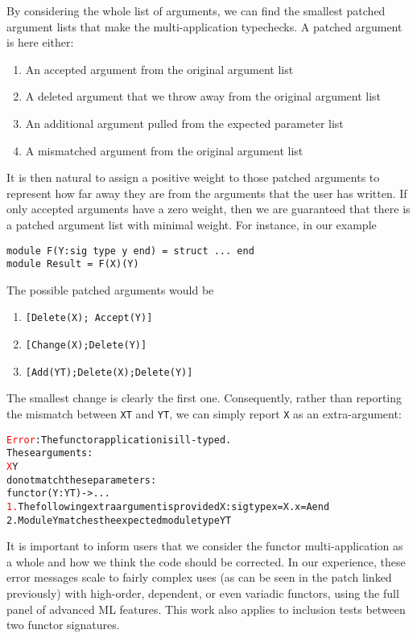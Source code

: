 \documentclass[a4paper,11pt]{scrartcl}
\newcommand{\error}[1]{\textcolor{red}{#1}}
\newcommand{\ok}[1]{\textcolor{OliveGreen}{#1}}
\begin{document}
By considering the whole list of arguments, we can find the smallest patched
argument lists that make the multi-application typechecks. A patched argument is here either:

\begin{enumerate}
\item An accepted argument from the original argument list
\item A deleted argument that we throw away from the original argument list
\item An additional argument pulled from the expected parameter list
\item A mismatched argument from the original argument list
\end{enumerate}

It is then natural to assign a positive weight to those patched arguments to represent how far away they
are from the arguments that the user has written.
If only accepted arguments have a zero weight, then we are guaranteed that there is a patched argument list
with minimal weight.
%
For instance, in our example

\begin{verbatim}
module F(Y:sig type y end) = struct ... end
module Result = F(X)(Y)
\end{verbatim}

The possible patched arguments would be

\begin{enumerate}
\item \texttt{[Delete(X); Accept(Y)]}
\item \texttt{[Change(X);Delete(Y)]}
\item \texttt{[Add(YT);Delete(X);Delete(Y)]}
\end{enumerate}

The smallest change is clearly the first one. Consequently, rather than reporting
the mismatch between \texttt{XT} and \texttt{YT}, we can simply report \texttt{X}
as an extra-argument:
\begin{alltt}
\error{Error}: The functor application is ill-typed.
       These arguments:
         \error{X} \ok{Y}
       do not match these parameters:
         functor  \ok{(Y : YT)} -> ...
  \error{1.} The following extra argument is provided X : sig type x = X.x = A end
  \ok{2.} Module Y matches the expected module type YT
\end{alltt}

It is important to inform users that we consider the
functor multi-application as a whole and how we think the code should be corrected.
In our experience, these error messages scale to fairly complex uses (as can be seen in the
patch linked previously) with high-order, dependent, or even variadic functors,
using the full panel of advanced ML features.
This work also applies to inclusion tests between two functor signatures.
\end{document}
